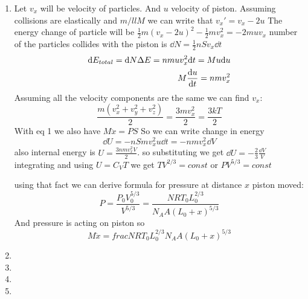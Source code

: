 \begin{sol}
    \begin{enumerate}[label=\textbf{(\alph*)}]
        \item 
        Let $v_x$ will be velocity of particles. And $u$ velocity of piston. Assuming collisions are elastically and $m/ll M$ we can write that $v_x'=v_x-2u$
        The energy change of particle will be $\frac12 m (v_x-2u)^2-\frac12 mv_x^2=-2muv_x$ number of the particles collides with the piston is 
        $\dd N=\frac12  nSv_x\dd t$ 
        \begin{align}
            \nonumber \dd E_{total}=\dd N\Delta E=nmuv_x^2\dd t=Mu\dd u\\
            M\dv{u}{t}=nmv_x^2
        \end{align}
        Assuming all the velocity components are the same we can find $v_x$: $$\frac{m(v_x^2+v_y^2+v_z^2)}{2}=\frac{3mv_x^2}{2}=\frac{3kT}{2}$$
        With eq 1 we also have $M\ddot{x}=PS$ So we can write change in energy $$\dd U=-nSmv_x^2u\dd t=-nmv_x^2\dd V$$ also internal energy is $U=\frac{3nmv_x^2V}{2}$. so substituting 
        we get $\dd U=-\frac{2}{3}\frac{\dd V}{V}$ integrating and using $U=C_VT$ we get $TV^{2/3}=const$ or $PV^{5/3}=const$

        using that fact we can derive formula for pressure at distance $x$ piston moved: $$P=\frac{P_0V_0^{5/3}}{V^{5/3}}=\frac{NRT_0L_0^{2/3}}{N_AA(L_0+x)^{5/3}}$$
        And pressure is acting on piston so $$M\ddot{x}=frac{NRT_0L_0^{2/3}}{N_AA(L_0+x)^{5/3}}$$
        \item
        \item 
        \item
        \item
    \end{enumerate}
\vspace{15mm}
\end{sol}
